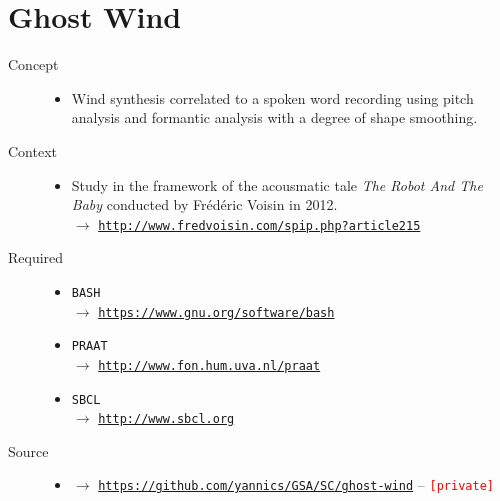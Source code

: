 
\section*{Ghost Wind}

\thispagestyle{empty}

\bigskip

\begin{description}
\item[Concept] \hfill 
\begin{itemize}
\item[] Wind synthesis correlated to a spoken word recording using pitch analysis and formantic analysis with a degree of shape smoothing.
\end{itemize}
\bigskip
\item[Context] \hfill 
\begin{itemize}
\item[] Study in the framework of the acousmatic tale \textit{The Robot And The Baby} conducted by Fr\'{e}d\'{e}ric Voisin in 2012. \\
$\rightarrow$ \href{http://www.fredvoisin.com/spip.php?article215}{\texttt{\small http://www.fredvoisin.com/spip.php?article215}}
\end{itemize}
\bigskip
\item[Required] \hfill 
\begin{itemize}
\setlength\itemsep{1em}
\item[] \texttt{BASH} \\ $\rightarrow$ \href{https://www.gnu.org/software/bash}{\texttt{\small https://www.gnu.org/software/bash}}
\item[] \texttt{PRAAT} \\ $\rightarrow$ \href{http://www.fon.hum.uva.nl/praat}{\texttt{\small http://www.fon.hum.uva.nl/praat}} 
\item[] \texttt{SBCL} \\ $\rightarrow$ \href{http://www.sbcl.org}{\texttt{\small http://www.sbcl.org}}
\end{itemize}
\bigskip
\item[Source] \hfill 
\begin{itemize}
\item[] $\rightarrow$ \href{https://github.com/yannics/GSA/SC/ghost-wind}{\texttt{\small https://github.com/yannics/GSA/SC/ghost-wind}} -- \texttt{\textcolor{red}{\small[private]}}
\end{itemize}

\end{description}
